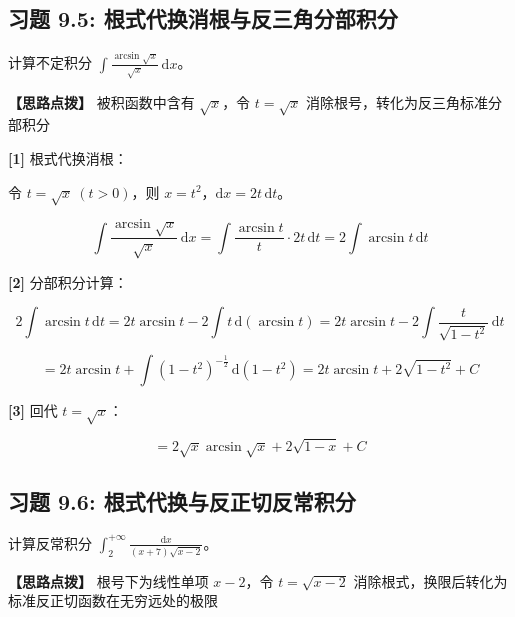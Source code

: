 \documentclass[11pt,a4paper,UTF8]{ctexart}
\begin{document}
\subsection{习题 9.5: 根式代换消根与反三角分部积分}

计算不定积分 $\int \frac{\arcsin\sqrt{x}}{\sqrt{x}}\,\mathrm{d}x$。

\textbf{\color{DeepPurple}【思路点拨】} 被积函数中含有 $\sqrt{x}$，令 $t = \sqrt{x}$ 消除根号，转化为反三角标准分部积分


\begin{solbox}[分步推导与答题规范]
\textbf{[1]} 根式代换消根：

令 $t = \sqrt{x} \ (t > 0)$，则 $x = t^2$，$\mathrm{d}x = 2t\,\mathrm{d}t$。


\begin{equation*}
\int \frac{\arcsin\sqrt{x}}{\sqrt{x}}\,\mathrm{d}x = \int \frac{\arcsin t}{t} \cdot 2t\,\mathrm{d}t = 2\int \arcsin t\,\mathrm{d}t
\end{equation*}


\textbf{[2]} 分部积分计算：


\begin{equation*}
2\int \arcsin t\,\mathrm{d}t = 2t\arcsin t - 2\int t\,\mathrm{d}(\arcsin t) = 2t\arcsin t - 2\int \frac{t}{\sqrt{1-t^2}}\,\mathrm{d}t
\end{equation*}



\begin{equation*}
= 2t\arcsin t + \int (1-t^2)^{-\frac{1}{2}}\,\mathrm{d}(1-t^2) = 2t\arcsin t + 2\sqrt{1-t^2} + C
\end{equation*}


\textbf{[3]} 回代 $t = \sqrt{x}$：


\begin{equation*}
= 2\sqrt{x}\arcsin\sqrt{x} + 2\sqrt{1-x} + C
\end{equation*}

\end{solbox}


\subsection{习题 9.6: 根式代换与反正切反常积分}

计算反常积分 $\int_2^{+\infty} \frac{\mathrm{d}x}{(x+7)\sqrt{x-2}}$。

\textbf{\color{DeepPurple}【思路点拨】} 根号下为线性单项 $x-2$，令 $t = \sqrt{x-2}$ 消除根式，换限后转化为标准反正切函数在无穷远处的极限
\end{document}
